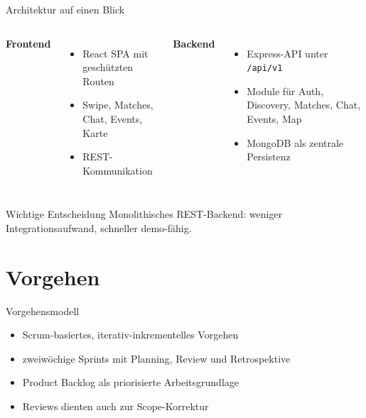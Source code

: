 \documentclass[
amberg,
compressedtitleimages,
toc=fancy,
footlinebox,
nometaot
]{OTHAWbeamer}
\begin{document}
\begin{frame}{Architektur auf einen Blick}
  \begin{columns}[T]
    \textbf{Frontend}
    \begin{itemize}
      \item React SPA mit geschützten Routen
      \item Swipe, Matches, Chat, Events, Karte
      \item REST-Kommunikation
    \end{itemize}

    \textbf{Backend}
    \begin{itemize}
      \item Express-API unter \texttt{/api/v1}
      \item Module für Auth, Discovery, Matches, Chat, Events, Map
      \item MongoDB als zentrale Persistenz
    \end{itemize}
  \end{columns}

  \vspace{0.3cm}

  \begin{block}{Wichtige Entscheidung}
    Monolithisches REST-Backend: weniger Integrationsaufwand, schneller demo-fähig.
  \end{block}
\end{frame}

\section{Vorgehen}

\begin{frame}{Vorgehensmodell}
  \begin{itemize}
    \item Scrum-basiertes, iterativ-inkrementelles Vorgehen
    \item zweiwöchige Sprints mit Planning, Review und Retrospektive
    \item Product Backlog als priorisierte Arbeitsgrundlage
    \item Reviews dienten auch zur Scope-Korrektur
  \end{itemize}
\end{frame}
\end{document}
